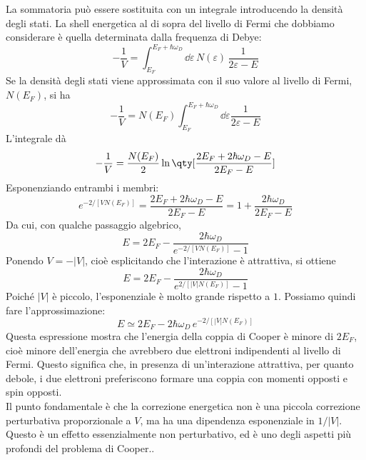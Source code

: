 La sommatoria può essere sostituita con un integrale introducendo la densità degli stati. La shell energetica al di sopra del livello di Fermi che dobbiamo considerare è quella determinata dalla frequenza di Debye:
\begin{equation*}
   -\frac{1}{V}
   =\int_{E_F}^{E_F+\hbar\omega_D}
   \dd{\varepsilon}\,
   N(\varepsilon)\,
   \frac{1}{2\varepsilon-E}
\end{equation*}
Se la densità degli stati viene approssimata con il suo valore al livello di Fermi, $N(E_F)$, si ha
\begin{equation*}
   -\frac{1}{V}
   =N(E_F)\int_{E_F}^{E_F+\hbar\omega_D} \dd{\varepsilon} \frac{1}{2\varepsilon-E}
\end{equation*}
L'integrale dà
\begin{equation*}
   -\frac{1}{V}
   =\frac{N(E_F)}{2}
   \ln\qty[ \frac{2E_F+2\hbar\omega_D-E}{2E_F-E} ]
\end{equation*}
Esponenziando entrambi i membri:
\begin{equation*}
   e^{-2/[V N(E_F)]}
   =\frac{2E_F+2\hbar\omega_D-E}{2E_F-E}
   =1+\frac{2\hbar\omega_D}{2E_F-E}
\end{equation*}
Da cui, con qualche passaggio algebrico,
\begin{equation*}
   E
   =2E_F-\frac{2\hbar\omega_D}{e^{-2/[V N(E_F)]}-1}
\end{equation*}
Ponendo $V=-|V|$, cioè esplicitando che l'interazione è attrattiva, si ottiene
\begin{equation*}
   E
   =2E_F-\frac{2\hbar\omega_D}{e^{2/[|V|N(E_F)]}-1}
\end{equation*}
Poiché $|V|$ è piccolo, l'esponenziale è molto grande rispetto a $1$. Possiamo quindi fare l'approssimazione:
\begin{equation}
   E
   \simeq
   2E_F-2\hbar\omega_D\, e^{-2/[|V|N(E_F)]}
   \label{eq:energia_cooper}
\end{equation}
Questa espressione mostra che l'energia della coppia di Cooper è minore di $2E_F$, cioè minore dell'energia che avrebbero due elettroni indipendenti al livello di Fermi. Questo significa che, in presenza di un'interazione attrattiva, per quanto debole, i due elettroni preferiscono formare una coppia con momenti opposti e spin opposti.\\
Il punto fondamentale è che la correzione energetica non è una piccola correzione perturbativa proporzionale a $V$, ma ha una dipendenza esponenziale in $1/|V|$. Questo è un effetto essenzialmente non perturbativo, ed è uno degli aspetti più profondi del problema di Cooper..\\

